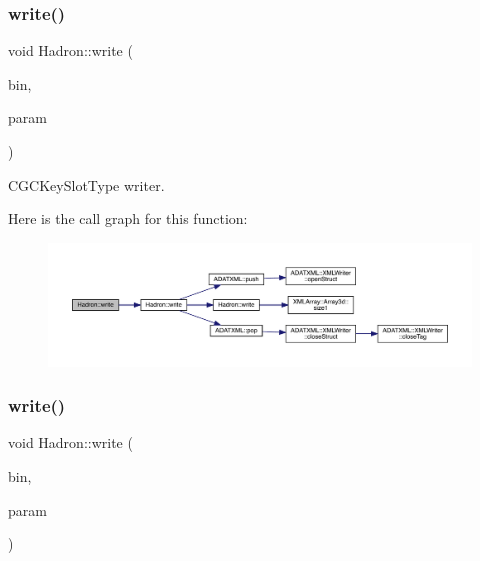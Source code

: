 \subsubsection{\texorpdfstring{write()}{write()}\hspace{0.1cm}{\footnotesize\ttfamily [1/95]}}
{\footnotesize\ttfamily void Hadron\+::write (\begin{DoxyParamCaption}\item[{\mbox{\hyperlink{classADATIO_1_1BinaryWriter}{Binary\+Writer}} \&}]{bin,  }\item[{const \mbox{\hyperlink{structHadron_1_1KeyCGCSU2__t}{Key\+C\+G\+C\+S\+U2\+\_\+t}} \&}]{param }\end{DoxyParamCaption})}



C\+G\+C\+Key\+Slot\+Type writer. 

Here is the call graph for this function\+:\nopagebreak
\begin{figure}[H]
\begin{center}
\leavevmode
\includegraphics[width=350pt]{d1/daf/namespaceHadron_aeadf04c31606521c48ee674d28e2ca3e_cgraph}
\end{center}
\end{figure}
\mbox{\label{namespaceHadron_a4073084eccc97c67b860f51e4efd91e0}} 
\subsubsection{\texorpdfstring{write()}{write()}\hspace{0.1cm}{\footnotesize\ttfamily [2/95]}}
{\footnotesize\ttfamily void Hadron\+::write (\begin{DoxyParamCaption}\item[{\mbox{\hyperlink{classADATIO_1_1BinaryWriter}{Binary\+Writer}} \&}]{bin,  }\item[{const \mbox{\hyperlink{structHadron_1_1KeyCGCPermS3__t}{Key\+C\+G\+C\+Perm\+S3\+\_\+t}} \&}]{param }\end{DoxyParamCaption})}



